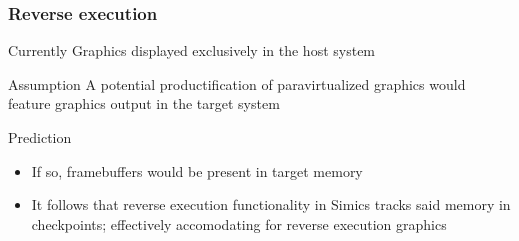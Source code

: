 
\begin{frame}

\frametitle{Reverse execution}

\begin{block}{Currently}
	Graphics displayed exclusively in the host system
\end{block}

\begin{block}{Assumption}
	A potential productification of paravirtualized graphics would feature graphics output in the target system
\end{block}

\begin{block}{Prediction}
	\begin{itemize}
		\item If so, framebuffers would be present in target memory
		\item It follows that reverse execution functionality in Simics tracks said memory in checkpoints; effectively accomodating for reverse execution graphics
	\end{itemize}
\end{block}

\end{frame}
